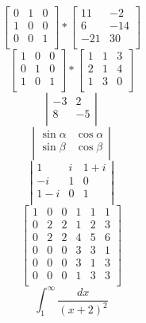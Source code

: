 \documentclass[a4paper]{article}
\begin{document}
$$\left[ \begin{array}{ccc}
0 & 1 & 0  \\
1 & 0 & 0  \\
0 & 0 & 1 \\
\end{array} \right]
*
\left[ \begin{array}{cc}
11 & -2  \\
6 & -14  \\
-21 & 30 \\
\end{array} \right]$$
$$\left[ \begin{array}{ccc}
1 & 0 & 0  \\
0 & 1 & 0  \\
1 & 0 & 1 \\
\end{array} \right]
*
\left[ \begin{array}{ccc}
1 & 1 & 3  \\
2 & 1 & 4  \\
1 & 3 & 0 \\
\end{array} \right]$$
$$ \left| \begin{array}{cc}
-3 & 2  \\
8 & -5  \\
\end{array} \right|$$
$$ \left| \begin{array}{cc}
\sin\alpha & \cos\alpha  \\
\sin\beta & \cos\beta  \\
\end{array} \right|$$
$$\left| \begin{array}{ccc}
1 & i & 1+i \\
-i & 1 & 0 \\
1-i & 0 & 1 \\
\end{array} \right|$$
$$\left[ \begin{array}{c|cc|ccc}
1 & 0 & 0 & 1 & 1 & 1 \\
\hline
0 & 2 & 2 & 1 & 2 & 3 \\
0 & 2 & 2 & 4 & 5 & 6 \\
\hline
0 & 0 & 0 & 3 & 3 & 1 \\
0 & 0 & 0 & 3 & 1 & 3 \\
0 & 0 & 0 & 1 & 3 & 3 \\
\end{array} \right]$$
$$\int_{1}^{\infty}\frac{dx}{(x+2)^2}$$
\end{document}
